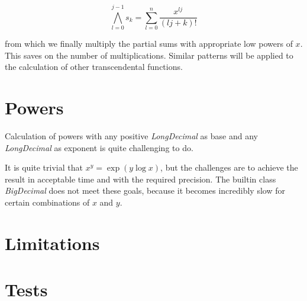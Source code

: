 \documentclass[10pt,a4paper]{article}
\begin{document}
$$ \bigwedge_{l=0}^{j-1} s_k = \sum_{l=0}^n \frac{x^{lj}}{(lj+k)!}$$

from which we finally multiply the partial sums with appropriate low powers of $x$.  This saves on the number of multiplications.
Similar patterns will be applied to the calculation of other transcendental functions.

\pagebreak

\section{Powers}

Calculation of powers with any positive {\slshape LongDecimal} as base and any {\slshape LongDecimal} as exponent is quite challenging to do.

It is quite trivial that $x^y = \exp(y \log x)$, but the challenges
are to achieve the result in acceptable time and with the required
precision.  The builtin class {\slshape BigDecimal} does not meet
these goals, because it becomes incredibly slow for certain
combinations of $x$ and $y$.  

\section{Limitations}

\section{Tests}
\end{document}
